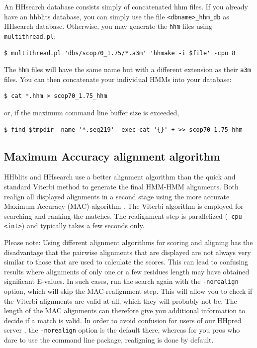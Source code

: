 \documentclass[11pt,a4paper]{article}
\begin{document}
An HHsearch database consists simply of concatenated hhm files. If you already have an hhblits database, you can simply use the file \verb`<dbname>_hhm_db` as HHsearch database. Otherwise, you may generate the \verb`hhm` files using \verb`multithread.pl`:
\begin{verbatim}
$ multithread.pl 'dbs/scop70_1.75/*.a3m' 'hhmake -i $file' -cpu 8 
\end{verbatim}
The \verb`hhm` files will have the same name but with a different extension as their \verb`a3m` files. You 
can then concatenate your individual HMMs into your database:
\begin{verbatim}
$ cat *.hhm > scop70_1.75_hhm
\end{verbatim}
or, if the maximum command line buffer size is exceeded, 
\begin{verbatim}
$ find $tmpdir -name '*.seq219' -exec cat '{}' + >> scop70_1.75_hhm
\end{verbatim}


\subsection{Maximum Accuracy alignment algorithm} \label{MAC}

HHblits and HHsearch use a better alignment algorithm than the quick and 
standard Viterbi method to generate the final HMM-HMM alignments. Both realign
all displayed alignments in a second stage using the more accurate Maximum Accuracy 
(MAC) algorithm \cite{Durbin:2008,Biegert:2008}. The Viterbi algorithm is employed 
for searching and ranking the matches. The realignment step is parallelized 
(\verb`-cpu <int>`) and typically takes a few seconds only.    

Please note: Using different alignment algorithms for scoring and aligning has the 
disadvantage that the pairwise alignments that are displayed are not always very similar to 
those that are used to calculate the scores. This can lead to confusing results 
where alignments of only one or a few residues length may have obtained significant
E-values. In such cases, run the search again with the \verb`-norealign` option, which will 
skip the MAC-realignment step. This will allow you to check if the Viterbi alignments 
are valid at all, which they will probably not be. The length of the MAC alignments 
can therefore give you additional information to decide if a match is valid. In order
to avoid confusion for users of our HHpred server \cite{Soding:2005b, Hildebrand:2009}, 
the \verb`-norealign` option is the default there, whereas for you pros who dare to use 
the command line package, realigning is done by default.
\end{document}
